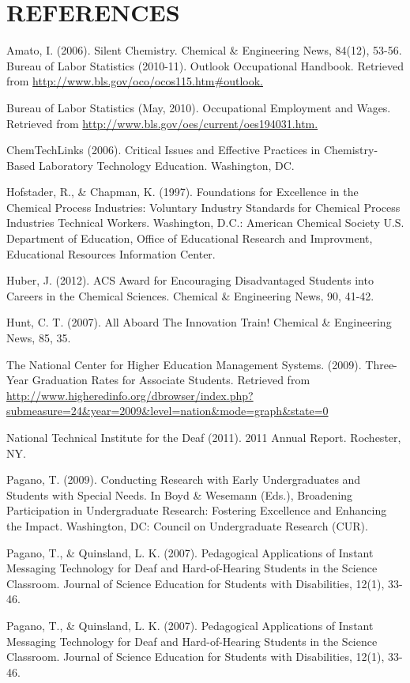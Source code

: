 \documentclass[11.5pt]{sig-alternate} %
\begin{document}
\section*{REFERENCES}\par 

\leftskip 0.25in
\parindent -0.25in 

Amato, I. (2006). Silent Chemistry. Chemical \& Engineering News, 84(12), 53-56.\\

Bureau of Labor Statistics (2010-11). Outlook Occupational Handbook. Retrieved from \url{http://www.bls.gov/oco/ocos115.htm#outlook.}

Bureau of Labor Statistics (May, 2010). Occupational Employment and Wages. Retrieved from \url{http://www.bls.gov/oes/current/oes194031.htm.}

ChemTechLinks (2006). Critical Issues and Effective Practices in Chemistry-Based Laboratory Technology Education. Washington, DC.

Hofstader, R., \& Chapman, K. (1997). Foundations for Excellence in the Chemical Process Industries: Voluntary Industry Standards for Chemical Process Industries Technical Workers. Washington, D.C.: American Chemical Society U.S. Department of Education, Office of Educational Research and Improvment, Educational Resources Information Center.

Huber, J. (2012). ACS Award for Encouraging Disadvantaged Students into Careers in the Chemical Sciences. Chemical \& Engineering News, 90, 41-42.

Hunt, C. T. (2007). All Aboard The Innovation Train! Chemical \& Engineering News, 85, 35.

The National Center for Higher Education Management Systems. (2009). Three-Year Graduation Rates for Associate Students. Retrieved from \url{http://www.higheredinfo.org/dbrowser/index.php?submeasure=24\&year=2009\&level=nation\&mode=graph\&state=0}

National Technical Institute for the Deaf (2011). 2011 Annual Report. Rochester, NY.

Pagano, T. (2009). Conducting Research with Early Undergraduates and Students with Special Needs. In Boyd \& Wesemann (Eds.), Broadening Participation in Undergraduate Research: Fostering Excellence and Enhancing the Impact. Washington, DC: Council on Undergraduate Research (CUR).

Pagano, T., \& Quinsland, L. K. (2007). Pedagogical Applications of Instant Messaging Technology for Deaf and Hard-of-Hearing Students in the Science Classroom. Journal of Science Education for Students with Disabilities, 12(1), 33-46.

Pagano, T., \& Quinsland, L. K. (2007). Pedagogical Applications of Instant Messaging Technology for Deaf and Hard-of-Hearing Students in the Science Classroom. Journal of Science Education for Students with Disabilities, 12(1), 33-46.
\end{document}
